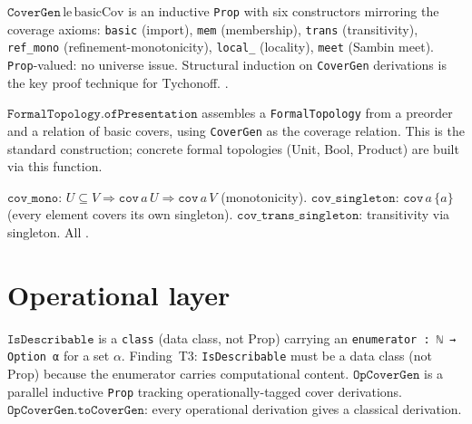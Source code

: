 \begin{definition}
\label{def:CoverGen}
\leanok
$\texttt{CoverGen}\,\text{le}\,\text{basicCov}$ is an inductive
\texttt{Prop} with six constructors mirroring the coverage axioms:
\texttt{basic} (import), \texttt{mem} (membership),
\texttt{trans} (transitivity), \texttt{ref\_mono} (refinement-monotonicity),
\texttt{local\_} (locality), \texttt{meet} (Sambin meet).
\texttt{Prop}-valued: no universe issue.  Structural induction on
\texttt{CoverGen} derivations is the key proof technique for Tychonoff.
\axiomprofile{[]}.
\end{definition}

\begin{definition}
\label{def:ofPresentation}
\leanok
{}
$\texttt{FormalTopology.ofPresentation}$ assembles a \texttt{FormalTopology}
from a preorder and a relation of basic covers, using \texttt{CoverGen}
as the coverage relation.  This is the standard construction; concrete
formal topologies (Unit, Bool, Product) are built via this function.
\end{definition}

\begin{theorem}
\label{thm:cov_utilities}
\leanok
{}
$\texttt{cov\_mono}$: $U \subseteq V \Rightarrow \texttt{cov}\,a\,U
\Rightarrow \texttt{cov}\,a\,V$ (monotonicity).
$\texttt{cov\_singleton}$: $\texttt{cov}\,a\,\{a\}$ (every element
covers its own singleton).
$\texttt{cov\_trans\_singleton}$: transitivity via singleton.
All \axiomprofile{[]}.
\end{theorem}

\section{Operational layer}
\label{sec:topology_operational}

\begin{definition}
\label{def:IsDescribable}
\leanok
{}
$\texttt{IsDescribable}$ is a \texttt{class} (data class, not Prop)
carrying an \texttt{enumerator : ℕ → Option α} for a set $\alpha$.
Finding~T3: \texttt{IsDescribable} must be a data class (not Prop)
because the enumerator carries computational content.
$\texttt{OpCoverGen}$ is a parallel inductive \texttt{Prop} tracking
operationally-tagged cover derivations.
$\texttt{OpCoverGen.toCoverGen}$: every operational derivation gives a
classical derivation.
\end{definition}

